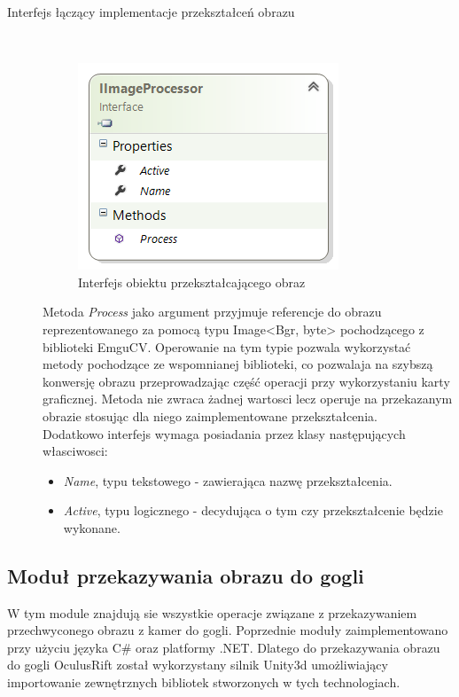 \documentclass[a4paper,11pt,twoside]{report}
\theoremstyle{definition}
\begin{document}
\begin{description}
\item [Interfejs łączący implementacje przekształceń obrazu] \hfill \\

\begin{figure}[h]
\centering
\includegraphics[scale=0.9]{images/IImageProcessor}
\caption[Przekształcenie diagram diagram]{Interfejs obiektu przekształcającego obraz}
\end{figure}

Metoda \textit{Process} jako argument przyjmuje referencje do obrazu reprezentowanego za pomocą typu Image<Bgr, byte> pochodzącego z biblioteki EmguCV. Operowanie na tym typie pozwala wykorzystać metody pochodzące ze wspomnianej biblioteki, co pozwalaja na szybszą konwersję obrazu przeprowadzając część operacji przy wykorzystaniu karty graficznej. Metoda nie zwraca żadnej wartosci lecz operuje na przekazanym obrazie stosując dla niego zaimplementowane przekształcenia.  \\
Dodatkowo interfejs wymaga posiadania przez klasy następujących własciwosci:
\begin{itemize}
\item  \textit{Name}, typu tekstowego - zawierająca nazwę przekształcenia.
\item \textit{Active}, typu logicznego -  decydująca o tym czy przekształcenie będzie wykonane.
\end{itemize}

\end{description}

\subsection{Moduł przekazywania obrazu do gogli}

W tym module znajdują sie wszystkie operacje związane z przekazywaniem przechwyconego obrazu z kamer do gogli. Poprzednie moduły zaimplementowano przy użyciu języka C\# oraz  platformy .NET. Dlatego do przekazywania obrazu do gogli OculusRift został wykorzystany silnik Unity3d umożliwiający importowanie zewnętrznych bibliotek stworzonych w tych technologiach.
\end{document}
